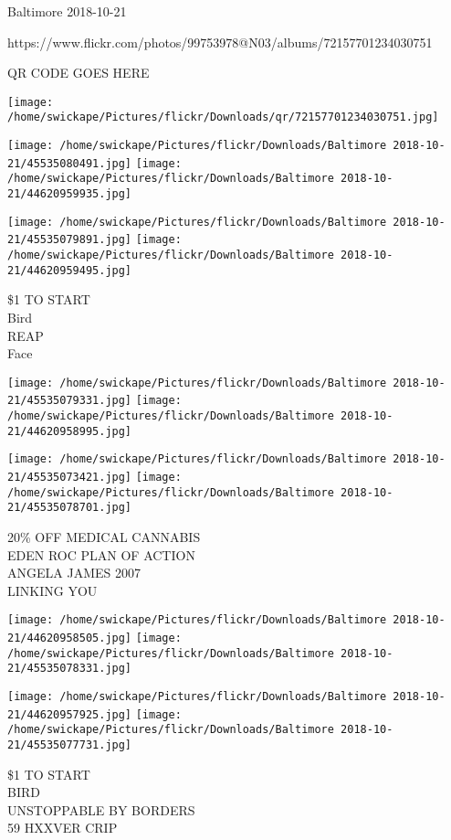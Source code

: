 \documentclass[10pt,letterpaper]{article}
\begin{document}
Baltimore 2018-10-21

https://www.flickr.com/photos/99753978@N03/albums/72157701234030751

QR CODE GOES HERE

\texttt{[image: /home/swickape/Pictures/flickr/Downloads/qr/72157701234030751.jpg]}
\pagebreak

\texttt{[image: /home/swickape/Pictures/flickr/Downloads/Baltimore 2018-10-21/45535080491.jpg]}
\texttt{[image: /home/swickape/Pictures/flickr/Downloads/Baltimore 2018-10-21/44620959935.jpg]}

\texttt{[image: /home/swickape/Pictures/flickr/Downloads/Baltimore 2018-10-21/45535079891.jpg]}
\texttt{[image: /home/swickape/Pictures/flickr/Downloads/Baltimore 2018-10-21/44620959495.jpg]}

\$1 TO START\\
Bird\\
REAP\\
Face\\
\pagebreak

\texttt{[image: /home/swickape/Pictures/flickr/Downloads/Baltimore 2018-10-21/45535079331.jpg]}
\texttt{[image: /home/swickape/Pictures/flickr/Downloads/Baltimore 2018-10-21/44620958995.jpg]}

\texttt{[image: /home/swickape/Pictures/flickr/Downloads/Baltimore 2018-10-21/45535073421.jpg]}
\texttt{[image: /home/swickape/Pictures/flickr/Downloads/Baltimore 2018-10-21/45535078701.jpg]}

20\% OFF MEDICAL CANNABIS\\
EDEN ROC PLAN OF ACTION\\
ANGELA JAMES 2007\\
LINKING YOU\\
\pagebreak

\texttt{[image: /home/swickape/Pictures/flickr/Downloads/Baltimore 2018-10-21/44620958505.jpg]}
\texttt{[image: /home/swickape/Pictures/flickr/Downloads/Baltimore 2018-10-21/45535078331.jpg]}

\texttt{[image: /home/swickape/Pictures/flickr/Downloads/Baltimore 2018-10-21/44620957925.jpg]}
\texttt{[image: /home/swickape/Pictures/flickr/Downloads/Baltimore 2018-10-21/45535077731.jpg]}

\$1 TO START\\
BIRD\\
UNSTOPPABLE BY BORDERS\\
59 HXXVER CRIP\\
\pagebreak
\end{document}
